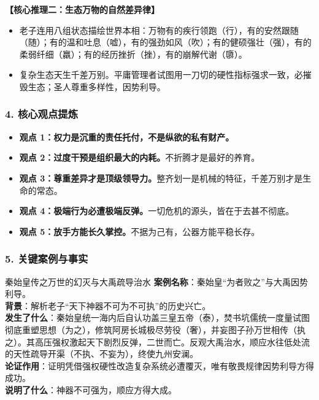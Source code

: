 \noindent\textbf{【核心推理二：生态万物的自然差异律】}
\begin{itemize}
    \item 老子连用八组状态描绘世界本相：万物有的疾行领跑（行），有的安然跟随（随）；有的温和吐息（嘘），有的强劲如风（吹）；有的健硕强壮（强），有的柔弱纤细（羸）；有的经历挫折（挫），有的崩解代谢（隳）。
    \item 复杂生态天生千差万别。平庸管理者试图用一刀切的硬性指标强求一致，必摧毁生态；圣人尊重多样性，因势利导。
\end{itemize}

\subsubsection{4. 核心观点提炼}
\begin{itemize}
    \item \textbf{观点 1：权力是沉重的责任托付，不是纵欲的私有财产。}
    \item \textbf{观点 2：过度干预是组织最大的内耗。}不折腾才是最好的养育。
    \item \textbf{观点 3：尊重差异才是顶级领导力。}整齐划一是机械的特征，千差万别才是生命的常态。
    \item \textbf{观点 4：极端行为必遭极端反弹。}一切危机的源头，皆在于去甚不彻底。
    \item \textbf{观点 5：放手方能长久掌控。}不据为己有，公器方能平稳长存。
\end{itemize}

\subsubsection{5. 关键案例与事实}
\begin{CaseBox}{秦始皇传之万世的幻灭与大禹疏导治水}
\textbf{案例名称}：秦始皇“为者败之”与大禹因势利导。\\
\textbf{背景}：解析老子“天下神器不可为不可执”的历史兴亡。\\
\textbf{发生了什么}：秦始皇统一海内后自认功盖三皇五帝（泰），焚书坑儒统一度量试图彻底重塑思想（为之），修筑阿房长城极尽劳役（奢），并妄图子孙万世相传（执之）。其高压强权激起天下剧烈反弹，二世而亡。反观大禹治水，顺应水往低处流的天性疏导开渠（不执、不妄为），终使九州安澜。\\
\textbf{论证作用}：证明凭借强权硬性改造复杂系统必遭覆灭，唯有敬畏规律因势利导方得成功。\\
\textbf{说明了什么}：神器不可强为，顺应方得大成。
\end{CaseBox}


